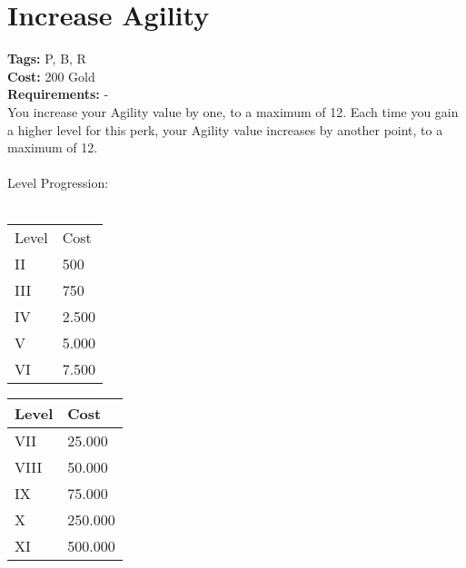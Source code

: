 \section{Increase Agility}\label{sec:increaseagility}
\textbf{Tags:} P, B, R\\
\textbf{Cost:} 200 Gold\\
\textbf{Requirements:} -\\
You increase your Agility value by one, to a maximum of 12.
Each time you gain a higher level for this perk, your Agility value increases by another point, to a maximum of 12.\\
\\
Level Progression:\\
\\
\begin{minipage}{0.5\textwidth}
    \begin{tabular}{l | l}
        Level & Cost\\
        II & 500\\
        III & 750\\
        IV & 2.500\\
        V & 5.000\\
        VI & 7.500\\
    \end{tabular}
\end{minipage}
\begin{minipage}{0.5\textwidth}
    \begin{tabular}{l | l}
        Level & Cost\\ \hline
        VII & 25.000\\
        VIII & 50.000\\
        IX & 75.000\\
        X & 250.000\\
        XI & 500.000\\
    \end{tabular}
\end{minipage}

